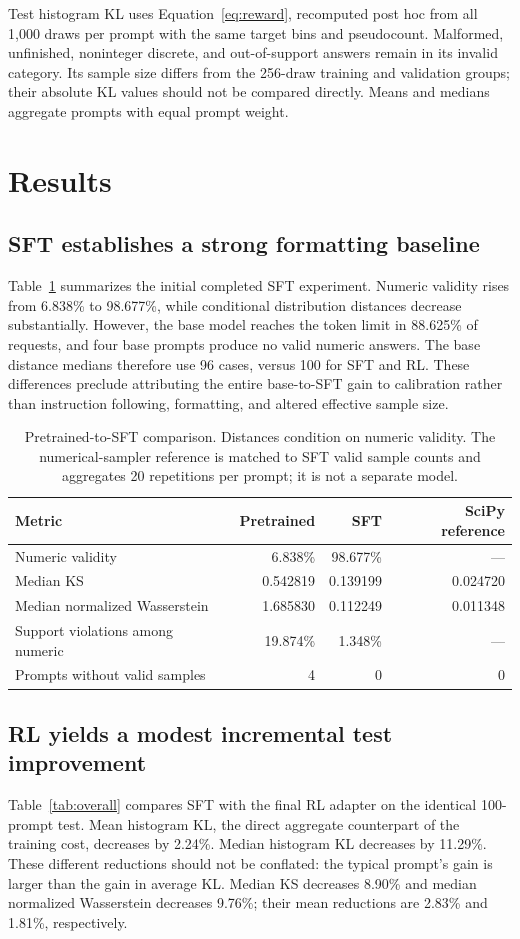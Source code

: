 \documentclass[11pt,letterpaper]{article}
\begin{document}
Test histogram KL uses Equation~\eqref{eq:reward}, recomputed post hoc from
all 1,000 draws per prompt with the same target bins and pseudocount.
Malformed, unfinished, noninteger discrete, and out-of-support answers remain
in its invalid category. Its sample size differs from the 256-draw training
and validation groups; their absolute KL values should not be compared
directly. Means and medians aggregate prompts with equal prompt weight.

\section{Results}
\subsection{SFT establishes a strong formatting baseline}
Table~\ref{tab:sft} summarizes the initial completed SFT experiment. Numeric
validity rises from 6.838\% to 98.677\%, while conditional distribution
distances decrease substantially. However, the base model reaches the token
limit in 88.625\% of requests, and four base prompts produce no valid
numeric answers. The base distance medians therefore use 96 cases, versus
100 for SFT and RL. These differences preclude attributing the entire
base-to-SFT gain to calibration rather than instruction following,
formatting, and altered effective sample size.

\begin{table}[htbp]
\centering\small
\caption{Pretrained-to-SFT comparison. Distances condition on numeric validity.
The numerical-sampler reference is matched to SFT valid sample counts and
aggregates 20 repetitions per prompt; it is not a separate model.}
\label{tab:sft}
\begin{tabular}{@{}lrrr@{}}
\toprule
Metric & Pretrained & SFT & SciPy reference\\
\midrule
Numeric validity & 6.838\% & 98.677\% & ---\\
Median KS & 0.542819 & 0.139199 & 0.024720\\
Median normalized Wasserstein & 1.685830 & 0.112249 & 0.011348\\
Support violations among numeric & 19.874\% & 1.348\% & ---\\
Prompts without valid samples & 4 & 0 & 0\\
\bottomrule
\end{tabular}
\end{table}

\subsection{RL yields a modest incremental test improvement}
Table~\ref{tab:overall} compares SFT with the final RL adapter on the identical
100-prompt test. Mean histogram KL, the direct aggregate counterpart of the
training cost, decreases by 2.24\%. Median histogram KL decreases by
11.29\%. These different reductions should not be conflated: the typical
prompt's gain is larger than the gain in average KL. Median KS decreases
8.90\% and median normalized Wasserstein decreases 9.76\%; their mean
reductions are 2.83\% and 1.81\%, respectively.
\end{document}
